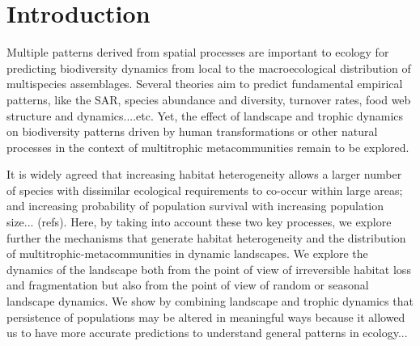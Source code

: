 \section{Introduction}

Multiple patterns derived from spatial processes are important to
ecology for predicting biodiversity dynamics from local to the
macroecological distribution of multispecies assemblages. Several
theories aim to predict fundamental empirical patterns, like the SAR,
species abundance and diversity, turnover rates, food web structure
and dynamics....etc. Yet, the effect of landscape and trophic dynamics
on biodiversity patterns driven by human transformations or other
natural processes in the context of multitrophic metacommunities
remain to be explored.

It is widely agreed that increasing habitat heterogeneity allows a
larger number of species with dissimilar ecological requirements to
co-occur within large areas; and increasing probability of population
survival with increasing population size... (refs). Here, by taking
into account these two key processes, we explore further the
mechanisms that generate habitat heterogeneity and the distribution of
multitrophic-metacommunities in dynamic landscapes. We explore the
dynamics of the landscape both from the point of view of irreversible
habitat loss and fragmentation but also from the point of view of
random or seasonal landscape dynamics. We show by combining landscape
and trophic dynamics that persistence of populations may be altered in
meaningful ways because it allowed us to have more accurate
predictions to understand general patterns in ecology...




\begin{comment}
Understanding the structure and dynamics of ecological networks has
become critical for understanding the persistence and stability of
ecosystems \cite{dunne2005modeling}. Robustness studies based on the
simulation of sequential extinction of species have revealled aspects
about the response of ecosystems to ecological disturbances at species
level \cite{desantana2013topological}. Such structural analyses are
relatively fast and easy but their utility in capturing important
information about functions and processes is often questioned
\cite{jordan2012simulating}, especially when considered the
variability of the effects of ecological disturbances among
individuals of the same species. Dynamical models in contrast provide
essential information especially if one needs to understand changes in
abundances, with the structure of the food web being almost constant
\cite{jordan2012simulating}.
\end{comment}


